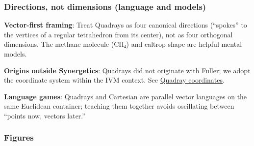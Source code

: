 \documentclass[
  10pt,
]{article}
\begin{document}
\subsubsection{Directions, not dimensions (language and
models)}\label{directions-not-dimensions-language-and-models}

\textbf{Vector-first framing}: Treat Quadrays as four canonical
directions (``spokes'' to the vertices of a regular tetrahedron from its
center), not as four orthogonal dimensions. The methane molecule (CH₄)
and caltrop shape are helpful mental models.

\textbf{Origins outside Synergetics}: Quadrays did not originate with
Fuller; we adopt the coordinate system within the IVM context. See
\href{https://en.wikipedia.org/wiki/Quadray_coordinates}{Quadray
coordinates}.

\textbf{Language games}: Quadrays and Cartesian are parallel vector
languages on the same Euclidean container; teaching them together avoids
oscillating between ``points now, vectors later.''

\subsubsection{Figures}\label{figures}
\end{document}
